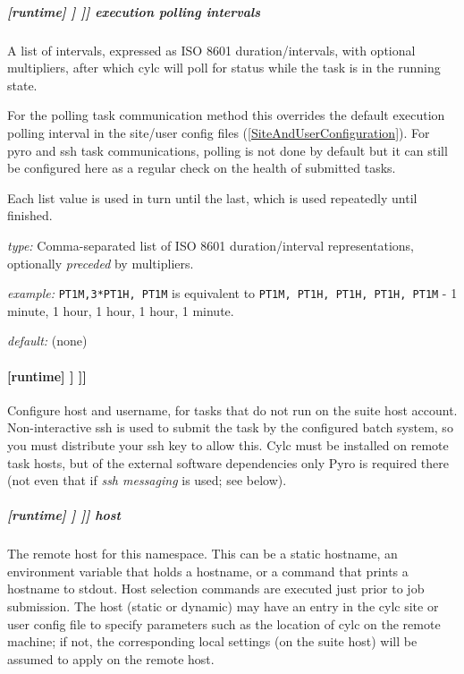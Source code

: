 \subparagraph[execution polling intervals]{[runtime] \textrightarrow [[\_\_NAME\_\_]] \textrightarrow [[[job]]] \textrightarrow execution polling intervals}
\label{ExecutionPollingIntervals}

A list of intervals, expressed as ISO 8601 duration/intervals, with optional
multipliers, after which cylc will poll for status while the task is in the
running state.

For the polling task communication method this overrides the default
execution polling interval in the site/user config files
(\ref{SiteAndUserConfiguration}). For pyro and ssh task communications,
polling is not done by default but it can still be configured here as a
regular check on the health of submitted tasks.

Each list value is used in turn until the last, which is used repeatedly
until finished.

\begin{myitemize}
    \item {\em type:} Comma-separated list of ISO 8601 duration/interval
        representations, optionally {\em preceded} by multipliers.
    \item {\em example:} \lstinline=PT1M,3*PT1H, PT1M= is equivalent to
    \lstinline=PT1M, PT1H, PT1H, PT1H, PT1M= - 1 minute, 1 hour, 1 hour, 1
    hour, 1 minute.
    \item {\em default:} (none)
\end{myitemize}

\paragraph[{[[[}remote{]]]}]{[runtime] \textrightarrow [[\_\_NAME\_\_]] \textrightarrow [[[remote]]]}

Configure host and username, for tasks that do not run on the suite host
account. Non-interactive ssh is used to submit the task by the configured
batch system, so you must distribute your ssh key to allow
this. Cylc must be installed on remote task hosts, but of the external
software dependencies only Pyro is required there (not even that if {\em
ssh messaging} is used; see below).

\subparagraph[host]{[runtime] \textrightarrow [[\_\_NAME\_\_]] \textrightarrow [[[remote]]] \textrightarrow host}
\label{DynamicHostSelection}

The remote host for this namespace. This can be a static hostname, an
environment variable that holds a hostname, or a command that prints a
hostname to stdout. Host selection commands are executed just prior to
job submission. The host (static or dynamic) may have an entry in the
cylc site or user config file to specify parameters such as the location
of cylc on the remote machine; if not, the corresponding local settings
(on the suite host) will be assumed to apply on the remote host.

